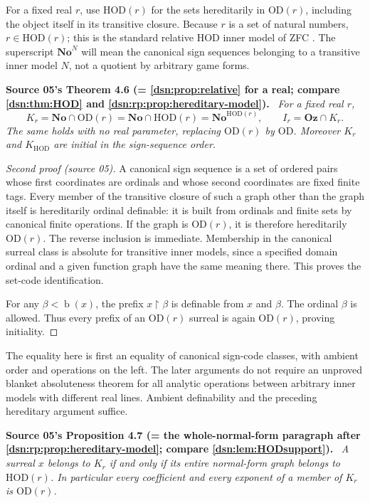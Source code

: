 \documentclass[11pt,a4paper]{article}
\numberwithin{equation}{section}
\theoremstyle{definition}
\theoremstyle{remark}
\newcommand{\No}{\mathbf{No}}
\newcommand{\Oz}{\mathbf{Oz}}
\newcommand{\OD}{\mathrm{OD}}
\newcommand{\HOD}{\mathrm{HOD}}
\newcommand{\bd}{\operatorname{b}}
\newcommand{\KH}{K_{\HOD}}
\newcommand{\res}{\mathbin{\upharpoonright}}
\newenvironment{dupstatement}[1]{\par\medskip\noindent\textbf{#1.}\ \begingroup\itshape\ignorespaces}{\endgroup\par\medskip}
\begin{document}
For a fixed real $r$, use $\HOD(r)$ for the sets hereditarily in
$\OD(r)$, including the object itself in its transitive closure.
Because $r$ is a set of natural numbers, $r\in\HOD(r)$; this is the
standard relative HOD inner model of ZFC \cite{Jech}.
The superscript $\No^N$ will mean the canonical sign sequences belonging
to a transitive inner model $N$, not a quotient by arbitrary game forms.
\begin{dupstatement}{Source 05's Theorem 4.6 (= \cref{dsn:prop:relative} for a real; compare \cref{dsn:thm:HOD} and \cref{dsn:rp:prop:hereditary-model})}
For a fixed real $r$,
\begin{equation}\label{dsn:ca:eq:hod}
 K_r=\No\cap\OD(r)=\No\cap\HOD(r)=\No^{\HOD(r)},
 \qquad I_r=\Oz\cap K_r.
\end{equation}
The same holds with no real parameter, replacing $\OD(r)$ by $\OD$.
Moreover $K_r$ and $\KH$ are initial in the sign-sequence order.
\end{dupstatement}
\begin{proof}[Second proof (source 05)]
A canonical sign sequence is a set of ordered pairs whose first
coordinates are ordinals and whose second coordinates are fixed finite
tags. Every member of the transitive closure of such a graph other than
the graph itself is hereditarily ordinal definable: it is built from
ordinals and finite sets by canonical finite operations. If the graph
is $\OD(r)$, it is therefore hereditarily $\OD(r)$. The reverse inclusion
is immediate. Membership in the canonical surreal class is absolute for
transitive inner models, since a specified domain ordinal and a given
function graph have the same meaning there. This proves the set-code
identification.

For any $\beta<\bd(x)$, the prefix $x\res\beta$ is definable from $x$
and $\beta$. The ordinal $\beta$ is allowed. Thus every prefix of an
$\OD(r)$ surreal is again $\OD(r)$, proving initiality.
\end{proof}
The equality here is first an equality of canonical sign-code classes,
with ambient order and operations on the left. The later arguments do
not require an unproved blanket absoluteness theorem for all analytic
operations between arbitrary inner models with different real lines.
Ambient definability and the preceding hereditary argument suffice.
\begin{dupstatement}{Source 05's Proposition 4.7 (= the whole-normal-form paragraph after \cref{dsn:rp:prop:hereditary-model}; compare \cref{dsn:lem:HODsupport})}
A surreal $x$ belongs to $K_r$ if and only if its entire normal-form graph
belongs to $\HOD(r)$. In particular every coefficient and every exponent
of a member of $K_r$ is $\OD(r)$.
\end{dupstatement}
\end{document}
